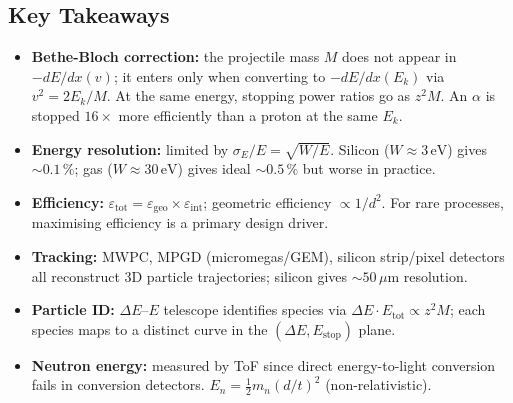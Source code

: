 \subsection*{Key Takeaways}
\begin{itemize}
  \item \textbf{Bethe-Bloch correction:} the projectile mass $M$ does
  not appear in $-dE/dx(v)$; it enters only when converting to
  $-dE/dx(E_k)$ via $v^2 = 2E_k/M$.  At the same energy, stopping power
  ratios go as $z^2 M$.  An $\alpha$ is stopped $16\times$ more efficiently
  than a proton at the same $E_k$.
  \item \textbf{Energy resolution:} limited by $\sigma_E/E = \sqrt{W/E}$.
  Silicon ($W \approx 3\,\text{eV}$) gives $\sim 0.1\,\%$; gas ($W \approx
  30\,\text{eV}$) gives ideal $\sim 0.5\,\%$ but worse in practice.
  \item \textbf{Efficiency:} $\varepsilon_\text{tot} = \varepsilon_\text{geo}
  \times \varepsilon_\text{int}$; geometric efficiency $\propto 1/d^2$.
  For rare processes, maximising efficiency is a primary design driver.
  \item \textbf{Tracking:} MWPC, MPGD (micromegas/GEM), silicon strip/pixel
  detectors all reconstruct 3D particle trajectories; silicon gives
  $\sim 50\,\mu\text{m}$ resolution.
  \item \textbf{Particle ID:} $\Delta E$–$E$ telescope identifies species via
  $\Delta E \cdot E_\text{tot} \propto z^2 M$; each species maps to a distinct
  curve in the $(\Delta E, E_\text{stop})$ plane.
  \item \textbf{Neutron energy:} measured by ToF since direct energy-to-light
  conversion fails in conversion detectors.
  $E_n = \tfrac{1}{2}m_n(d/t)^2$ (non-relativistic).
\end{itemize}

